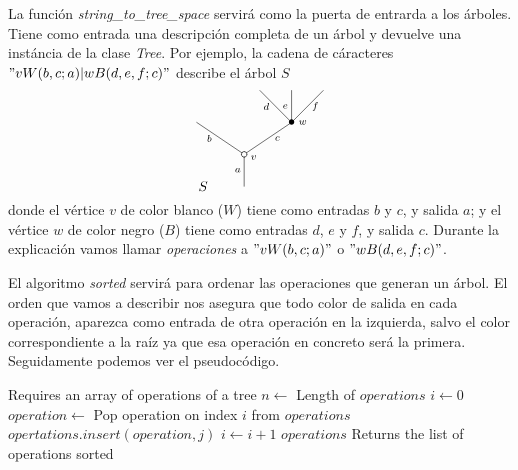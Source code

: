 \documentclass[../main.tex]{subfiles}
\begin{document}
La funci\'on \emph{string\_to\_tree\_space} servir\'a como la puerta de entrarda a los \'arboles. Tiene como entrada una descripci\'on completa de un \'arbol y devuelve una inst\'ancia de la clase \emph{Tree}. Por ejemplo,
la cadena de c\'aracteres $"vW(b,c;a)|wB(d,e,f;c)"$ describe el \'arbol $S$
$$
    \xy
    <0.08cm, 0cm>:
    (0.0, 0.0)*{}="1"; %
    (0.0, 10.0)*\cir<2pt>{}="2"; %
    (-15.0, 20.0)*{}="3"; %
    (15.0, 20.0)*={\bullet}="7"; %
    (5.0, 30.0)*{}="8"; %
    (15.0, 30.0)*{}="9"; %
    (25.0, 30.0)*{}="10"; %
    "1";"2" **\dir{-};
    "2";"3" **\dir{-};
    "2";"7" **\dir{-};
    "7";"8" **\dir{-};
    "7";"9" **\dir{-};
    "7";"10" **\dir{-};
    (3.0, 9.0)*=0{\scriptstyle v};
    (18.5, 20.0)*=0{\scriptstyle w};
    (-2.0, 5.0)*=0{\scriptstyle a};
    (-11, 15.0)*=0{\scriptstyle b};
    (10.5, 15.0)*=0{\scriptstyle c};
    (7.0, 25.0)*=0{\scriptstyle d};
    (13.0, 25.0)*=0{\scriptstyle e};
    (22.5, 25.0)*=0{\scriptstyle f};
    (-13,0)*{S};
    \endxy
$$
donde el v\'ertice $v$ de color blanco ($W$) tiene como entradas $b$ y $c$, y salida $a$; y el v\'ertice $w$ de color negro ($B$) tiene como entradas $d$, $e$ y $f$, y salida $c$.
Durante la explicaci\'on vamos llamar \emph{operaciones} a $"vW(b,c;a)"$ o $"wB(d,e,f;c)"$.

El algoritmo \emph{sorted} servir\'a para ordenar las operaciones que generan un \'arbol. El orden que vamos a describir nos asegura que todo color de salida en cada operaci\'on, aparezca como entrada de otra operaci\'on en la izquierda, salvo el color correspondiente a la ra\'iz ya que esa operaci\'on en concreto ser\'a la primera.
Seguidamente podemos ver el pseudoc\'odigo.

\begin{algoritmo}
    \caption{Pseudoc\'odigo del algoritmo para ordenar las operaciones de un \'arbol $T$. Pod\'eis encontrar el c\'odigo completo en el anexo.}
    \begin{algorithmic}[1]
        \Require Requires an array of operations of a tree
        \State $n\leftarrow$ Length of $operations$
        \State $i\leftarrow 0$ 
        \For{$j$ in $[i+1,\dots,n)$}
        \State $operation\leftarrow$ Pop operation on index $i$ from $operations$
        \State $opertations.insert(operation,j)$ 
        \State\Break
        \EndIf
        \EndFor
        \ForElse {}
        \State $i \leftarrow i+1$
        \EndForElse
        \EndWhile
        \State\Return $operations$
        \EndFunction
        \Ensure Returns the list of operations sorted
    \end{algorithmic}
\end{algoritmo}
\end{document}
